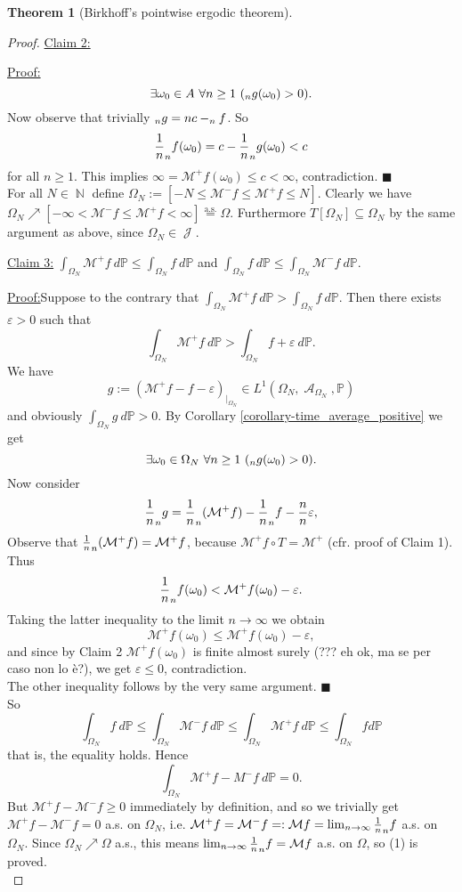 \documentclass[12pt,a4paper]{report}
\theoremstyle{definition}
\newtheorem{theorem}{Theorem}[chapter] %
\theoremstyle{num.custom-title}
\newenvironment{claim}[1]{\par\noindent\underline{Claim#1:}\space}{} %
\newenvironment{claimproof}[1]{\par\noindent\underline{Proof:}\space#1}{\leavevmode\unskip\penalty9999 \hbox{}\nobreak\hfill\quad\hbox{$\blacksquare$}} %
\DeclareMathOperator{\A}{\mathcal{A}}
\DeclareMathOperator{\J}{\mathcal{J}}
\DeclareMathOperator{\N}{\mathbb{N}}
\DeclareMathOperator{\sse}{\subseteq}
\let\S\relax %
\DeclareMathOperator{\S}{S}
\newcommand{\M}{\mathcal{M}}
\renewcommand{\epsilon}{\varepsilon}
\renewcommand{\1}{\mathbbm{1}}
\renewcommand{\P}{\mathbb{P}}
\begin{document}
\begin{theorem}[Birkhoff's pointwise ergodic theorem]
\begin{proof}
\begin{claim}{ 2}
\begin{claimproof}
\[
\exists \omega_0 \in A \ \forall n \geq 1 \ (\S_n g(\omega_0) > 0).
\]
Now observe that trivially $\S_n g = nc - \S_n f$. So
\[
\frac{1}{n} \S_n f(\omega_0) = c - \frac{1}{n} \S_n g(\omega_0) < c
\]
for all $n \geq 1$. This implies $\infty = \M^+ f(\omega_0) \leq c < \infty$, contradiction.
\end{claimproof}
\end{claim}\\
For all $N \in \N$ define $\Omega_N := [-N \leq \M^- f \leq \M^+ f \leq N]$. Clearly we have $\Omega_N \nearrow [-\infty < \M^- f \leq \M^+ f < \infty] \stackrel{\text{a.s.}}{=} \Omega$. Furthermore $T[\Omega_N] \sse \Omega_N$ by the same argument as above, since $\Omega_N \in \J$.
\begin{claim}{ 3}
$\int_{\Omega_N} \M^+ f \ d\P \leq \int_{\Omega_N} f \ d\P$ and $\int_{\Omega_N} f \ d\P \leq \int_{\Omega_N} \M^- f \ d\P$.
\begin{claimproof}
Suppose to the contrary that $\int_{\Omega_N} \M^+ f \ d\P > \int_{\Omega_N} f \ d\P$. Then there exists $\epsilon>0$ such that
\[
\int_{\Omega_N} \M^+ f \ d\P > \int_{\Omega_N} f+\epsilon \ d\P.
\]
We have
\[
g := (\M^+ f - f - \epsilon)_{|_{\Omega_N}} \in L^1(\Omega_N,\A_{\Omega_N},\P)
\]
and obviously $\int_{\Omega_N} g \ d\P > 0$. By Corollary \ref{corollary-time_average_positive} we get
\[
\exists \omega_0 \in \Omega_N \ \forall n \geq 1 \ (\S_n g(\omega_0) > 0).
\]
Now consider
\[
\frac{1}{n} \S_n g = \frac{1}{n} \S_n (\M^+ f) - \frac{1}{n} \S_n f - \frac{n}{n} \epsilon,
\]
Observe that $\frac{1}{n} \S_n (\M^+ f) = \M^+ f$, because $\M^+ f \circ T = \M^+$ (cfr. proof of Claim 1). Thus
\[
\frac{1}{n} \S_n f(\omega_0) < \M^+ f(\omega_0) - \epsilon.
\]
Taking the latter inequality to the limit $n \to \infty$ we obtain
\[
\M^+ f(\omega_0) \leq \M^+ f(\omega_0) - \epsilon,
\]
and since by Claim 2 $\M^+ f(\omega_0)$ is finite almost surely (??? eh ok, ma se per caso non lo è?), we get $\epsilon \leq 0$, contradiction.\\
The other inequality follows by the very same argument.
\end{claimproof}
\end{claim}\\
So
\[
\int_{\Omega_N} f \ d\P \leq \int_{\Omega_N} \M^- f \ d\P \leq \int_{\Omega_N} \M^+ f \ d\P \leq \int_{\Omega_N} f d\P
\]
that is, the equality holds. Hence
\[
\int_{\Omega_N} \M^+ f - M^- f \ d\P = 0.
\]
But $\M^+ f - \M^- f \geq 0$ immediately by definition, and so we trivially get $\M^+ f - \M^- f = 0$ a.s. on $\Omega_N$, i.e. $\M^+ f = \M^- f =: \M f = \lim_{n \to \infty} \frac{1}{n} \S_n f$ a.s. on $\Omega_N$. Since $\Omega_N \nearrow \Omega$ a.s., this means $\lim_{n \to \infty} \frac{1}{n} \S_n f = \M f$ a.s. on $\Omega$, so (1) is proved.\\

\end{proof}
\end{theorem}
\end{document}
